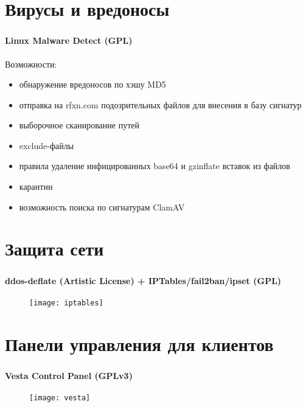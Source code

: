 
\section{Вирусы и вредоносы}

\begin{frame}
\frametitle{\insertsection}
\framesubtitle{Linux Malware Detect (GPL)}
Возможности:
\begin{itemize}
	\item обнаружение вредоносов по хэшу MD5
	\item отправка на rfxn.com подозрительных файлов для внесения в базу сигнатур
	\item выборочное сканирование путей
	\item exclude-файлы
	\item правила удаление инфицированных base64 и gzinflate вставок из файлов
	\item карантин
	\item возможность поиска по сигнатурам ClamAV
\end{itemize}
\end{frame}


\section{Защита сети}

\begin{frame}
\frametitle{\insertsection}
\framesubtitle{ddos-deflate (Artistic License) + IPTables/fail2ban/ipset (GPL)}
\begin{figure}[h]
	\begin{center}
		\texttt{[image: iptables]}
	 \end{center}
\end{figure}
\end{frame}


\section{Панели управления для клиентов}

\begin{frame}
\frametitle{\insertsection}
\framesubtitle{Vesta Control Panel (GPLv3)}
\begin{figure}[h]
	\begin{center}
		\texttt{[image: vesta]}
	 \end{center}
\end{figure}
\end{frame}

